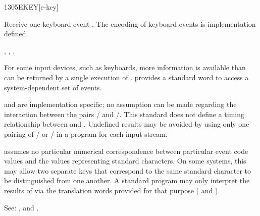 \begin{worddef}{1305}{EKEY}[e-key]
\item {}

	Receive one keyboard event . The encoding of keyboard events
	is implementation defined.

\see {},
	,
	.


	\begin{rationale} %
		For some input devices, such as keyboards, more information is
		available than can be returned by a single execution of
		.   provides a standard word to access a
		system-dependent set of events.

		 and  are implementation specific; no
		assumption can be made regarding the interaction between the
		pairs / and /.
		This standard does not define a timing relationship between
		 and .  Undefined results may be
		avoided by using only one pairing of /
		or / in a program for each input
		stream.

		 assumes no particular numerical correspondence
		between particular event code values and the values
		representing standard characters.  On some systems, this may
		allow two separate keys that correspond to the same standard
		character to be distinguished from one another.  A standard
		program may only interpret the results of  via the
		translation words provided for that purpose
		( and ).


		See: ,  and
		.
	\end{rationale}
\end{worddef}


